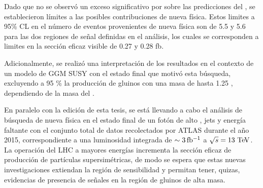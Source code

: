 Dado que no se observó un exceso significativo por sobre las predicciones del
{\SM}, se establecieron límites a las posibles contribuciones de nueva física.
Estos limites a 95\% CL en el número de eventos provenientes de nueva física son
de 5.5 y 5.6 para las dos regiones de señal definidas en el análisis, los cuales
se corresponden a limites en la sección eficaz visible de 0.27 y 0.28 fb.


Adicionalmente, se realizó una interpretación de los resultados en el contexto
de un modelo de GGM SUSY con el estado final que motivó esta búsqueda, excluyendo
a 95 \% {\cl} la producción de gluinos con una masa de hasta 1.25 \tev, dependiendo de la masa
del {\ninoone}.


En paralelo con la edición de esta tesis, se está llevando a cabo el análisis de
búsqueda de nueva física en el estado final de un fotón de alto {\pt}, jets y
energía faltante con el conjunto total de datos recolectados por ATLAS durante
el a\~no 2015, correspondiente a una luminosidad integrada de $\sim
\unit[3]{fb^{-1}}$ a $\sqrt{s}=13 \tev$. La operación del LHC a
mayores energías incrementa la sección eficaz de producción de partículas
supersimétricas, de modo se espera que estas nuevas investigaciones extiendan la región de
sensibilidad y permitan tener, quizas, evidencias de presencia de se\~nales en la
región de gluinos de alta masa.

